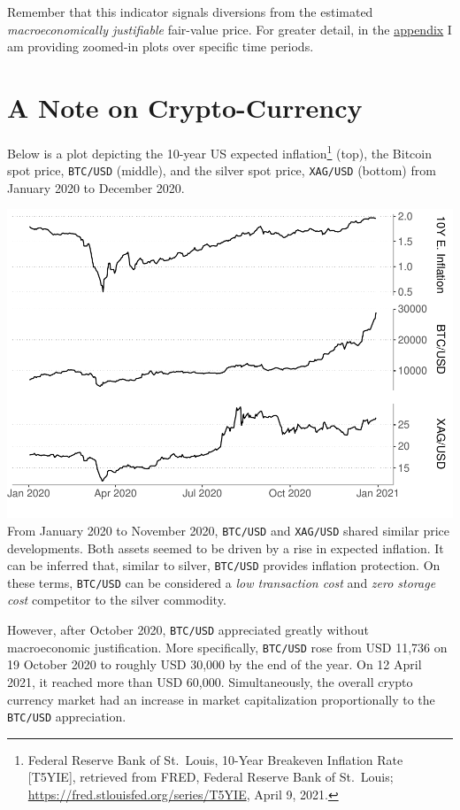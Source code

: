 \documentclass[
  12pt,
]{article}
\begin{document}
Remember that this indicator signals diversions from the estimated
\emph{macroeconomically justifiable} fair-value price. For greater
detail, in the \protect\hyperlink{appendix-zoomed-plots}{appendix} I am
providing zoomed-in plots over specific time periods.

\hypertarget{a-note-on-crypto-currency}{%
\section{A Note on Crypto-Currency}\label{a-note-on-crypto-currency}}

Below is a plot depicting the 10-year US expected inflation\footnote{Federal
  Reserve Bank of St.~Louis, 10-Year Breakeven Inflation Rate
  {[}T5YIE{]}, retrieved from FRED, Federal Reserve Bank of St.~Louis;
  \url{https://fred.stlouisfed.org/series/T5YIE}, April 9, 2021.} (top),
the Bitcoin spot price, \texttt{BTC/USD} (middle), and the silver spot
price, \texttt{XAG/USD} (bottom) from January 2020 to December 2020.

\includegraphics{silver-market-timing_files/figure-latex/bitcoin-1.pdf}
From January 2020 to November 2020, \texttt{BTC/USD} and
\texttt{XAG/USD} shared similar price developments. Both assets seemed
to be driven by a rise in expected inflation. It can be inferred that,
similar to silver, \texttt{BTC/USD} provides inflation protection. On
these terms, \texttt{BTC/USD} can be considered a \emph{low transaction
cost} and \emph{zero storage cost} competitor to the silver commodity.

However, after October 2020, \texttt{BTC/USD} appreciated greatly
without macroeconomic justification. More specifically, \texttt{BTC/USD}
rose from USD 11,736 on 19 October 2020 to roughly USD 30,000 by the end
of the year. On 12 April 2021, it reached more than USD 60,000.
Simultaneously, the overall crypto currency market had an increase in
market capitalization proportionally to the \texttt{BTC/USD}
appreciation.
\end{document}
